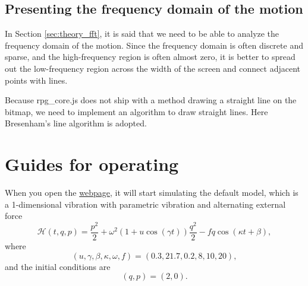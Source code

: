 \documentclass[12pt]{article}
\begin{document}
\subsection{Presenting the frequency domain of the motion}

In Section \ref{sec:theory_fft},
it is said that we need to be able to analyze the frequency domain of the motion.
Since the frequency domain is often discrete and sparse,
and the high-frequency region is often almost zero,
it is better to spread out the low-frequency region across the width of the screen
and connect adjacent points with lines.

Because rpg\_core.js does not ship with a method drawing a straight line on the bitmap,
we need to implement an algorithm to draw straight lines.
Here Bresenham's line algorithm \cite{gaol2013bresenham} is adopted.

\section{Guides for operating}
\label{sec:program}

When you open the \href{https://UlyssesZh.github.io/rpg/mechsimul2}{webpage},
it will start simulating the default model,
which is a 1-dimensional vibration with parametric vibration \cite[p. 82]{landau1976mechanics} and alternating external force \cite[p. 61]{landau1976mechanics}
\begin{equation}
  \mathcal H\left(t,q,p\right)=\frac{p^2}2+\omega^2\left(1+u\cos\left(\gamma t\right)\right)\frac{q^2}2-fq\cos\left(\kappa t+\beta\right),
\end{equation}
where
\begin{equation*}
  \left(u,\gamma,\beta,\kappa,\omega,f\right)=\left(0.3,21.7,0.2,8,10,20\right),
\end{equation*}
and the initial conditions are
\begin{equation*}
  \left(q,p\right)=\left(2,0\right).
\end{equation*}
\end{document}
